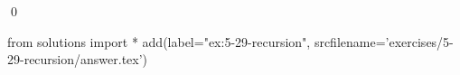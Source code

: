 
\begin{ex}
  \label{ex:5-29-recursion}
  
  \qed
\end{ex}
\begin{python0}
from solutions import *
add(label="ex:5-29-recursion",
    srcfilename='exercises/5-29-recursion/answer.tex')
\end{python0}
